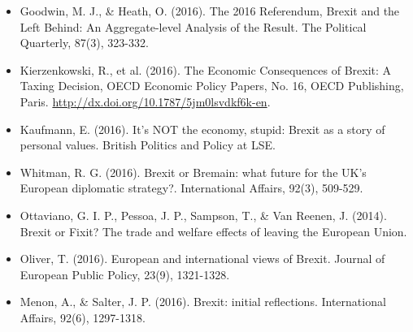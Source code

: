 \begin{itemize}
	\item Goodwin, M. J., \& Heath, O. (2016). The 2016 Referendum, Brexit and the Left Behind: An Aggregate-level Analysis of the Result. The Political Quarterly, 87(3), 323-332.
	\item Kierzenkowski, R., et al.  (2016). The Economic Consequences of Brexit: A Taxing Decision, OECD Economic Policy Papers, No. 16, OECD Publishing, Paris.
	\url{http://dx.doi.org/10.1787/5jm0lsvdkf6k-en}.
	\item Kaufmann, E. (2016). It’s NOT the economy, stupid: Brexit as a story of personal values. British Politics and Policy at LSE.
	\item Whitman, R. G. (2016). Brexit or Bremain: what future for the UK's European diplomatic strategy?. International Affairs, 92(3), 509-529.
	\item Ottaviano, G. I. P., Pessoa, J. P., Sampson, T., \& Van Reenen, J. (2014). Brexit or Fixit? The trade and welfare effects of leaving the European Union.
	\item Oliver, T. (2016). European and international views of Brexit. Journal of European Public Policy, 23(9), 1321-1328.
	\item Menon, A., \& Salter, J. P. (2016). Brexit: initial reflections. International Affairs, 92(6), 1297-1318.
	
\end{itemize}
